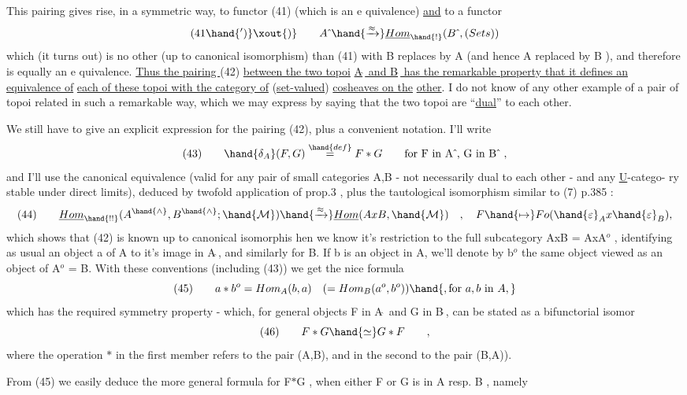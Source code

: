 
This pairing gives rise, in a symmetric way,  to  functor (41) (which is
an e quivalence)  \uline{and} to a functor
\[ (41\hand{')}\xout{)} \qquad A\hat{\ } \hand{\xrightarrow{\approx}} \underline{Hom}_{\hand{!}}(B\hat{\ }, (Sets)) \]
which (it turns out) is no  other (up to canonical isomorphism) than
(41) with B replaces by A (and hence A replaced by B ),  and therefore is
equally an e quivalence.  \uline{Thus the pairing }(42)  \uline{between the two topoi}
\uline{A$\hat{\ }$ and B$\hat{\ }$ has the remarkable property that it defines an equivalence of}
\uline{each of these topoi with the category of} (\uline{set-valued}) \uline{cosheaves on the}
\uline{other}.  I do not know of any other example of a pair of topoi related
in such a remarkable way,  which we may express by saying that the two
topoi are ``\uline{dual}'' to each other.

We still have to give an explicit expression for the pairing (42),
plus a convenient notation.  I'll write
\[ (43) \qquad \hand{\delta_A}(F,G) \overset{\hand{def}}{=} F \ast G \qquad \text{for  F in A$\hat{\ }$, G in B$\hat{\ }$ } , \]
and I'll use the canonical equivalence (valid for any pair of small
categories A,B  - not necessarily dual to each other -  and any \uline{U}-catego-%
ry  stable under direct limits),  deduced by twofold application of
prop.3 ,  plus the tautological isomorphism similar to (7) p.385  :
\[ (44) \qquad \underline{Hom}_{\hand{!!}}(A^{\hand{\wedge}},B^{\hand{\wedge}}; \hand{\mathcal{M}}) \hand{\xrightarrow{\approx}} \underline{Hom}(AxB, \hand{\mathcal{M}}) \quad , \quad F \hand{\mapsto} Fo(\hand{\varepsilon}_{A} x \hand{\varepsilon}_B) , \]
which shows that (42) is known up to canonical isomorphis  hen we know
it's restriction to the full subcategory AxB = AxA$^{o}$ ,  identifying as
usual an object a of A to it's image in A$\hat{\ }$, and similarly for B.  If
b is an object in A,  we'll denote by b$^{o}$  the same object viewed as an
object of A$^{o}$ = B.  With these conventions (including (43)) we get the
nice formula
\[ (45) \qquad a \ast b^{o} = Hom_A(b,a) \quad ( = Hom_B(a^{o},b^{o}) ) \hand{, \text{for } a,b \text{ in } A,} \]
which has the required symmetry property  -  which,  for general
objects  F in A$\hat{\ }$ and G in B$\hat{\ }$,  can be stated as  a bifunctorial isomor
\[ (46) \qquad F \ast G \hand{\simeq} G \ast F \qquad , \]
where the operation $\ast$  in the first member refers to the pair (A,B),  and
in the second to the pair  (B,A)).

From (45)  we easily deduce the more general formula for F$\ast$G , when
either F or G is in A resp. B ,  namely

